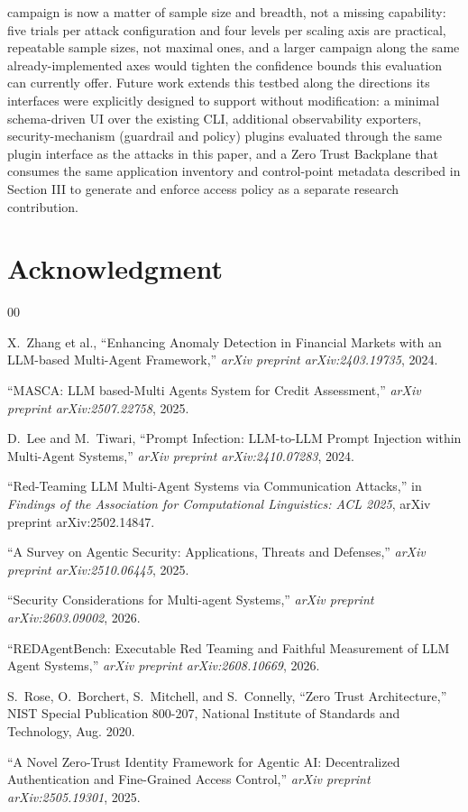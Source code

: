 \documentclass[conference]{IEEEtran}
\begin{document}
campaign is now a matter of sample size and breadth, not a missing capability: five trials per attack configuration and four levels per scaling axis are practical, repeatable sample sizes, not maximal ones, and a larger campaign along the same already-implemented axes would tighten the confidence bounds this evaluation can currently offer. Future work extends this testbed along the directions its interfaces were explicitly designed to support without modification: a minimal schema-driven UI over the existing CLI, additional observability exporters, security-mechanism (guardrail and policy) plugins evaluated through the same plugin interface as the attacks in this paper, and a Zero Trust Backplane that consumes the same application inventory and control-point metadata described in Section III to generate and enforce access policy as a separate research contribution.

\section*{Acknowledgment}

\begin{thebibliography}{00}

X.~Zhang et al., ``Enhancing Anomaly Detection in Financial Markets with an LLM-based Multi-Agent Framework,'' \emph{arXiv preprint arXiv:2403.19735}, 2024.

``MASCA: LLM based-Multi Agents System for Credit Assessment,'' \emph{arXiv preprint arXiv:2507.22758}, 2025.

D.~Lee and M.~Tiwari, ``Prompt Infection: LLM-to-LLM Prompt Injection within Multi-Agent Systems,'' \emph{arXiv preprint arXiv:2410.07283}, 2024.

``Red-Teaming LLM Multi-Agent Systems via Communication Attacks,'' in \emph{Findings of the Association for Computational Linguistics: ACL 2025}, arXiv preprint arXiv:2502.14847.

``A Survey on Agentic Security: Applications, Threats and Defenses,'' \emph{arXiv preprint arXiv:2510.06445}, 2025.

``Security Considerations for Multi-agent Systems,'' \emph{arXiv preprint arXiv:2603.09002}, 2026.

``REDAgentBench: Executable Red Teaming and Faithful Measurement of LLM Agent Systems,'' \emph{arXiv preprint arXiv:2608.10669}, 2026.

S.~Rose, O.~Borchert, S.~Mitchell, and S.~Connelly, ``Zero Trust Architecture,'' NIST Special Publication 800-207, National Institute of Standards and Technology, Aug. 2020.

``A Novel Zero-Trust Identity Framework for Agentic AI: Decentralized Authentication and Fine-Grained Access Control,'' \emph{arXiv preprint arXiv:2505.19301}, 2025.

\end{thebibliography}
\vspace{12pt}
\end{document}
